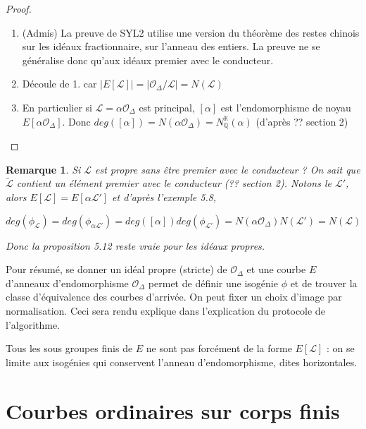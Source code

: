 \documentclass{article}
\newcommand{\Q}[0]{\mathbb{Q}}
\newcommand{\K}[0]{\mathbb{K}}
\newcommand{\OR}[0]{\mathcal{O}}
\newcommand{\LR}[0]{\mathcal{L}}
\newcommand{\CL}[0]{\tilde{\LR}}
\newtheorem{Rem}[The]{Remarque}
\begin{document}
\begin{proof}
	\begin{enumerate}
		\item (Admis) La preuve de SYL2 utilise une version du théorème des restes chinois sur les idéaux fractionnaire, sur l'anneau des entiers. La preuve ne se généralise donc qu'aux idéaux premier avec le conducteur.  
		
		\item Découle de 1. car $\left| E\left[\LR\right]\right| = \left| \OR_{\Delta}/\LR\right| = N\left( \LR\right)$
		\item En particulier si $\LR = \alpha\OR_{\Delta}$ est principal, $[\alpha]$ est l'endomorphisme de noyau $E\left[\alpha\OR_{\Delta}\right]$. 
		Donc $deg \left( \left[\alpha \right] \right) = N\left( \alpha\OR_{\Delta}\right) = N_{\Q}^{\K}\left( \alpha\right) $ (d'après ?? section 2)
	\end{enumerate}
\end{proof}

\begin{Rem}
	
	Si $\LR$ est propre sans être premier avec le conducteur ? On sait que $\CL$ contient un élément premier avec le conducteur (?? section 2). Notons le $\LR'$, alors $E\left[\LR\right] = E\left[ \alpha\LR'\right]$ et d'après l'exemple 5.8, 
	
	$deg(\phi_{\LR}) = deg(\phi_{\alpha\LR'}) = deg([\alpha])deg(\phi_{\LR'}) = N(\alpha\OR_{\Delta})N(\LR') = N(\LR)$
	
	Donc la proposition 5.12 reste vraie pour les idéaux propres. 
	
\end{Rem}

Pour résumé, se donner un idéal propre (stricte) de $\OR_{\Delta}$ et une courbe $E$ d'anneaux d'endomorphisme $\OR_{\Delta}$ permet de définir une isogénie $\phi$ et de trouver la classe d'équivalence des courbes d'arrivée. On peut fixer un choix d'image par normalisation. 
Ceci sera rendu explique dans l'explication du protocole de l'algorithme. 

Tous les sous groupes finis de $E$ ne sont pas forcément de la forme $E[\LR]$ : on se limite aux isogénies qui conservent l’anneau d'endomorphisme, dites horizontales. 










\section{Courbes ordinaires sur corps finis}
\end{document}
